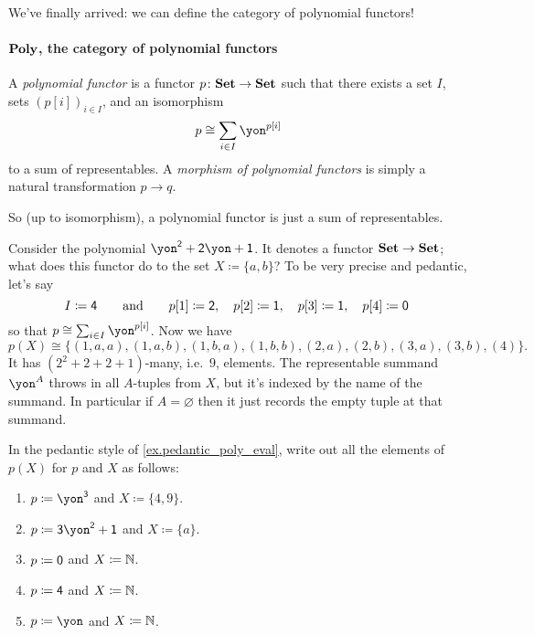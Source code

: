 \documentclass[DynamicalBook]{subfiles}
\begin{document}
We've finally arrived: we can define the category of polynomial functors!

\paragraph{$\textbf{Poly}$, the category of polynomial functors}

\begin{definition}
A \emph{polynomial functor} is a functor $p\colon\textbf{Set}\to\textbf{Set}$ such that there exists a set $I$, sets $(p[i])_{i\in I}$, and an isomorphism
\[p\cong\sum_{i\in I}\yon^{p[i]}\]
to a sum of representables.
A \emph{morphism of polynomial functors} is simply a natural transformation $p\to q$.
\end{definition}

So (up to isomorphism), a polynomial functor is just a sum of representables.

\begin{example}\label{ex.pedantic_poly_eval}
Consider the polynomial $\yon^\2+\2\yon+\1$. It denotes a functor $\textbf{Set}\to\textbf{Set}$; what does this functor do to the set $X\coloneqq\{a,b\}$? 
To be very precise and pedantic, let's say
\[
I\coloneqq\textsf{4}\qquad\text{and}\qquad
  p[1]\coloneqq\textsf{2},\quad
  p[2]\coloneqq\textsf{1},\quad
  p[3]\coloneqq\textsf{1},\quad
  p[4]\coloneqq\textsf{0}\
\]
so that $p\cong\sum_{i\in I}\yon^{p[i]}$. Now we have
\[
p(X)\cong
\{(1,a,a),(1,a,b),(1,b,a),(1,b,b),(2,a),(2,b),(3,a),(3,b),(4)\}.
\]
It has $(2^2+2+2+1)$-many, i.e.\ $9$, elements. The representable summand $\yon^A$ throws in all $A$-tuples from $X$, but it's indexed by the name of the summand. In particular if $A=\varnothing$ then it just records the empty tuple at that summand.
\end{example}

\begin{exercise}
In the pedantic style of \cref{ex.pedantic_poly_eval}, write out all the elements of $p(X)$ for $p$ and $X$ as follows:
\begin{enumerate}
	\item $p\coloneqq\yon^\3$ and $X\coloneqq\{4,9\}.$
	\item $p\coloneqq\3\yon^\2+\1$ and $X\coloneqq\{a\}$.
	\item $p\coloneqq\textsf{0}$ and $X\coloneqq\mathbb{N}$.
	\item $p\coloneqq\textsf{4}$ and $X\coloneqq\mathbb{N}$.
	\item $p\coloneqq\yon$ and $X\coloneqq\mathbb{N}$.
\qedhere
\end{enumerate}
\end{exercise}
\end{document}
